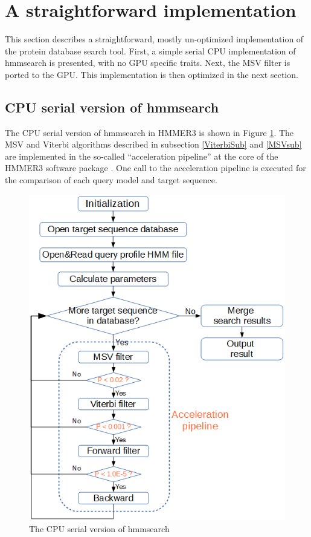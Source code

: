 
\section{A straightforward implementation}

This section describes a straightforward, mostly un-optimized implementation of the protein database search tool. First, a simple serial CPU implementation of hmmsearch is presented, with no GPU specific traits. Next, the MSV filter is ported to the GPU. This implementation is then optimized in the next section.

\subsection{CPU serial version of hmmsearch}

The CPU serial version of hmmsearch in HMMER3 is shown in Figure \ref{fig:hmmsearch}. The MSV and Viterbi algorithms described in subsection \ref{ViterbiSub} and \ref{MSVsub} are implemented in the so-called “acceleration pipeline” at the core of the HMMER3 software package \citep{HMMER3}. One call to the acceleration pipeline is executed for the comparison of each query model and target sequence.

\begin{figure}[!htb]
 \centering
 \includegraphics[totalheight=0.5\textheight]{Figures/hmmsearch.png}
 \caption{\selectfont The CPU serial version of hmmsearch}
 \label{fig:hmmsearch}
\end{figure}

